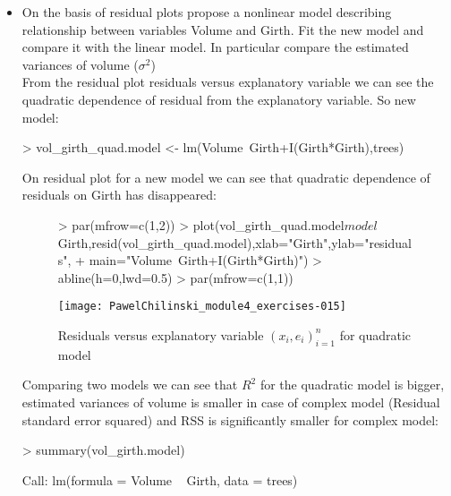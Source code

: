 \documentclass[a4paper]{article}
\begin{document}
\begin{itemize}
\begin{figure}[H]
\begin{center}
\begin{Schunk}
\begin{Sinput}
> par(mfrow=c(1,2))
> plot(vol_girth.model$fitted,resid(vol_girth.model),xlab="Fitted volume",ylab="residuals",
+ 		main="Volume~Girth")
> abline(h=0,lwd=0.5)
> plot(vol_height.model$fitted,resid(vol_height.model),xlab="Fitted volume",ylab="residuals",
+ 		main="Volume~Height")
> abline(h=0,lwd=0.5)
> par(mfrow=c(1,1))	
\end{Sinput}
\end{Schunk}
\texttt{[image: PawelChilinski\_module4\_exercises-013]}
\caption{Residuals versus predicted values ${(\hat{Y}_i,e_i)}_{i=1}^n$}
\end{center}
\end{figure}

\item On the basis of residual plots propose a nonlinear model describing
relationship between variables Volume and Girth. Fit the new model and compare it with the linear model. In particular compare the estimated variances of volume
($\sigma^2$)
\\

From the residual plot residuals versus explanatory variable we can see the
quadratic dependence of residual from the explanatory variable. So new model:
\begin{Schunk}
\begin{Sinput}
> vol_girth_quad.model <- lm(Volume~Girth+I(Girth*Girth),trees)	
\end{Sinput}
\end{Schunk}
On residual plot for a new model we can see that quadratic dependence of
residuals on Girth has disappeared:  
\begin{figure}[H]
\begin{center}
\begin{Schunk}
\begin{Sinput}
> par(mfrow=c(1,2))
> plot(vol_girth_quad.model$model$Girth,resid(vol_girth_quad.model),xlab="Girth",ylab="residuals",
+ 		main="Volume~Girth+I(Girth*Girth)")
> abline(h=0,lwd=0.5)
> par(mfrow=c(1,1))	
\end{Sinput}
\end{Schunk}
\texttt{[image: PawelChilinski\_module4\_exercises-015]}
\caption{Residuals versus explanatory variable ${(x_i,e_i)}_{i=1}^n$ for
quadratic model}
\end{center}
\end{figure}
Comparing two models we can see that $R^2$ for the quadratic model is bigger,
estimated variances of volume is smaller in case of complex model (Residual
standard error squared) and RSS is significantly smaller for complex model:
\begin{Schunk}
\begin{Sinput}
> summary(vol_girth.model)
\end{Sinput}
\begin{Soutput}
Call:
lm(formula = Volume ~ Girth, data = trees)


\end{Soutput}
\end{Schunk}
\end{itemize}
\end{document}
